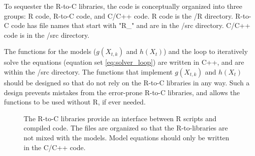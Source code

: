 \documentclass{article}
\begin{document}
To sequester the R-to-C libraries, the code is conceptually organized into three groups: R code, R-to-C code, and C/C++ code. R code is the /R directory. R-to-C code has file names that start with "R\_" and are in the /src directory. C/C++ code is in the /src directory.

The functions for the models ($g(X_{t,k})$ and $h(X_{t})$) and the loop to iteratively solve the equations (equation set \ref{eq:solver_loop}) are written in C++, and are within the /src directory. The functions that implement $g(X_{t,k})$ and $h(X_{t})$ should be designed so that do not rely on the R-to-C libraries in any way. Such a design prevents mistakes from the error-prone R-to-C libraries, and allows the functions to be used without R, if ever needed.


\begin{figure}[!ht]
\caption{\label{fig:code_organization} The R-to-C libraries provide an interface between R scripts and compiled code. The files are organized so that the R-to-libraries are not mixed with the models. Model equations should only be written in the C/C++ code.}
%
%
% 
% 
\begin{center}
\end{center}
\end{figure}
\end{document}
